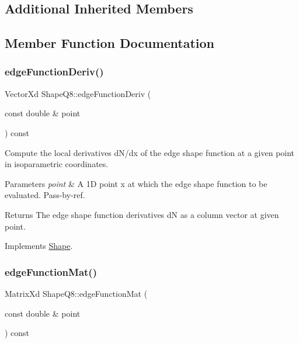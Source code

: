 \subsection*{Additional Inherited Members}


\subsection{Member Function Documentation}
\mbox{\label{class_shape_q8_a81582d03b2fc79a8a5705111ad85163f}} 
\subsubsection{\texorpdfstring{edge\+Function\+Deriv()}{edgeFunctionDeriv()}}
{\footnotesize\ttfamily Vector\+Xd Shape\+Q8\+::edge\+Function\+Deriv (\begin{DoxyParamCaption}\item[{const double \&}]{point }\end{DoxyParamCaption}) const\hspace{0.3cm}{\ttfamily [virtual]}}



Compute the local derivatives d\+N/dx of the edge shape function at a given point in isoparametric coordinates. 


\begin{DoxyParams}{Parameters}
{\em point} & A 1D point x at which the edge shape function to be evaluated. Pass-\/by-\/ref. \\
\hline
\end{DoxyParams}
\begin{DoxyReturn}{Returns}
The edge shape function derivatives dN as a column vector at given point. 
\end{DoxyReturn}


Implements \mbox{\hyperlink{class_shape_a652164292592de3157eb4021f43c9305}{Shape}}.

\mbox{\label{class_shape_q8_a0c52ac2dbeb9297c11e03c664d4750b7}} 
\subsubsection{\texorpdfstring{edge\+Function\+Mat()}{edgeFunctionMat()}}
{\footnotesize\ttfamily Matrix\+Xd Shape\+Q8\+::edge\+Function\+Mat (\begin{DoxyParamCaption}\item[{const double \&}]{point }\end{DoxyParamCaption}) const\hspace{0.3cm}{\ttfamily [virtual]}}



